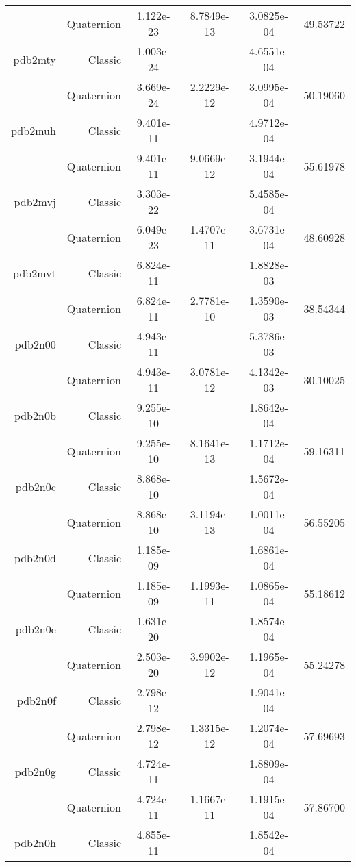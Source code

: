 \begin{xltabular}{\textwidth}{r|rS[table-format=1.3e+2]S[table-format=1.4e+2]S[table-format=1.4e+2]S[table-format=-1.5]}
& Quaternion & 1.122e-23 & 8.7849e-13 & 3.0825e-04 & 49.53722\\  \addlinespace
pdb2mty & Classic & 1.003e-24 &  & 4.6551e-04 & \\
& Quaternion & 3.669e-24 & 2.2229e-12 & 3.0995e-04 & 50.19060\\  \addlinespace
pdb2muh & Classic & 9.401e-11 &  & 4.9712e-04 & \\
& Quaternion & 9.401e-11 & 9.0669e-12 & 3.1944e-04 & 55.61978\\  \addlinespace
pdb2mvj & Classic & 3.303e-22 &  & 5.4585e-04 & \\
& Quaternion & 6.049e-23 & 1.4707e-11 & 3.6731e-04 & 48.60928\\  \addlinespace
pdb2mvt & Classic & 6.824e-11 &  & 1.8828e-03 & \\
& Quaternion & 6.824e-11 & 2.7781e-10 & 1.3590e-03 & 38.54344\\  \addlinespace
pdb2n00 & Classic & 4.943e-11 &  & 5.3786e-03 & \\
& Quaternion & 4.943e-11 & 3.0781e-12 & 4.1342e-03 & 30.10025\\  \addlinespace
pdb2n0b & Classic & 9.255e-10 &  & 1.8642e-04 & \\
& Quaternion & 9.255e-10 & 8.1641e-13 & 1.1712e-04 & 59.16311\\  \addlinespace
pdb2n0c & Classic & 8.868e-10 &  & 1.5672e-04 & \\
& Quaternion & 8.868e-10 & 3.1194e-13 & 1.0011e-04 & 56.55205\\  \addlinespace
pdb2n0d & Classic & 1.185e-09 &  & 1.6861e-04 & \\
& Quaternion & 1.185e-09 & 1.1993e-11 & 1.0865e-04 & 55.18612\\  \addlinespace
pdb2n0e & Classic & 1.631e-20 &  & 1.8574e-04 & \\
& Quaternion & 2.503e-20 & 3.9902e-12 & 1.1965e-04 & 55.24278\\  \addlinespace
pdb2n0f & Classic & 2.798e-12 &  & 1.9041e-04 & \\
& Quaternion & 2.798e-12 & 1.3315e-12 & 1.2074e-04 & 57.69693\\  \addlinespace
pdb2n0g & Classic & 4.724e-11 &  & 1.8809e-04 & \\
& Quaternion & 4.724e-11 & 1.1667e-11 & 1.1915e-04 & 57.86700\\  \addlinespace
pdb2n0h & Classic & 4.855e-11 &  & 1.8542e-04 & \\

\end{xltabular}
